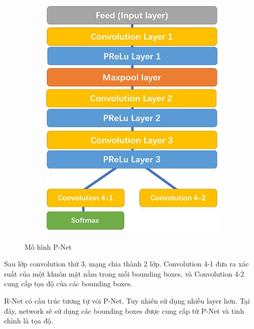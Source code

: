 \begin{figure}
    \begin{subfigure}{1.\textwidth}
        \begin{center}
            \includegraphics[width=0.6\linewidth]{Chapters/items/chap2_10.jpg}
        \end{center}
        \label{fig:chap2_10}
    \end{subfigure}
    \caption{Mô hình P-Net}
\end{figure}

\newpage
Sau lớp convolution thứ 3, mạng chia thành 2 lớp. Convolution 4-1 đưa ra xác suất của một khuôn mặt
nằm trong mỗi bounding boxes, và Convolution 4-2 cung cấp tọa độ của các bounding boxes.

R-Net có cấu trúc tương tự vói P-Net. Tuy nhiên sử dụng nhiều layer hơn.
Tại đây, network sẽ sử dụng các bounding boxes được cung cấp từ P-Net và tinh chỉnh là tọa độ.

